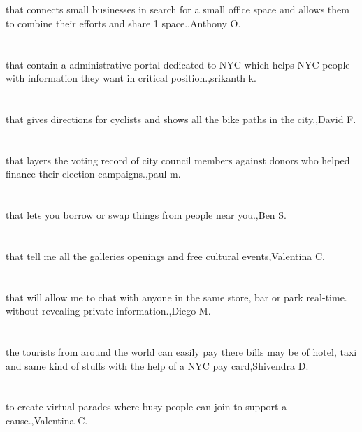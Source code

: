\section{}that connects small businesses in search for a small office space and allows them to combine their efforts and share 1 space.,Anthony O.
\section{}that contain a administrative portal dedicated to NYC which helps NYC people with information they want in critical position.,srikanth k.
\section{}that gives directions for cyclists and shows all the bike paths in the city.,David F.
\section{}that layers the voting record of city council members against donors who helped finance their election campaigns.,paul m.
\section{}that lets you borrow or swap things from people near you.,Ben S.
\section{}that tell me all the galleries openings and free cultural events,Valentina C.
\section{}that will allow me to chat with anyone in the same store, bar or park real-time. without revealing private information.,Diego M.
\section{}the tourists from around the world can easily pay there bills may be of hotel, taxi and same kind of stuffs with the help of a NYC pay card,Shivendra D.
\section{}to create virtual parades where busy people can join to support a cause.,Valentina C.
